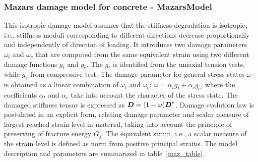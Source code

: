 \documentclass[a4paper]{article}
\newcommand{\mbf}[1]{\mbox{\boldmath$#1$}}
\begin{document}
\subsubsection{Mazars damage model for concrete - MazarsModel}
This isotropic damage model assumes that the stiffness degradation is
isotropic, i.e., stiffness moduli corresponding to different
directions decrease proportionally and independently of direction of
loading.
It introduces two damage parameters $\omega_t$ and $\omega_c$ that
are computed from the same equivalent strain using two different damage functions
$g_t$ and $g_c$. The $g_t$ is identified from the uniaxial tension tests, while
$g_c$ from compressive test. The damage parameter for general stress states
$\omega$ is obtained as a linear combination of $\omega_t$ and $\omega_c$:
$\omega=\alpha_t g_t + \alpha_c g_c$, where the coefficients
$\alpha_t$ and $\alpha_c$ take into account the character of the
stress state.
The damaged stiffness tensor is expressed as
$\mbf{D}=(1-\omega)\mbf{D}^e$.
Damage evolution law is postulated in an explicit form, relating
damage parameter and scalar measure of largest reached strain level in
material, taking into account the principle of preserving of fracture
energy $G_f$. The equivalent strain, i.e., a scalar measure of the
strain level is defined as norm from positive principal strains.
The model description and parameters are summarized
in table~\ref{maz_table}.
\end{document}
